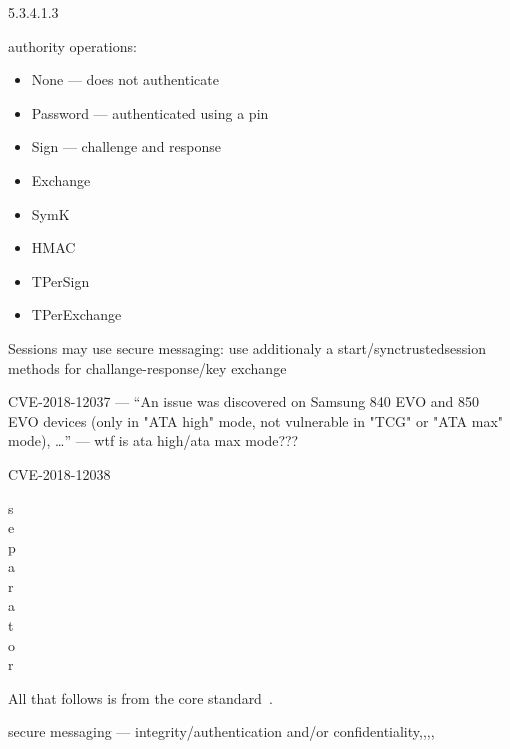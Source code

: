 \documentclass[
  digital, %
  oneside, %
  nolof,     %
  nolot,     %
]{fithesis4}
\begin{document}
5.3.4.1.3

authority operations: 
\begin{itemize}
    \item None --- does not authenticate
    \item Password --- authenticated using a pin
    \item Sign --- challenge and response
    \item Exchange
    \item SymK
    \item HMAC
    \item TPerSign
    \item TPerExchange
\end{itemize}

Sessions may use secure messaging: 
use additionaly a start/synctrustedsession methods for challange-response/key exchange

CVE-2018-12037  --- ``An issue was discovered on Samsung 840 EVO and 850 EVO devices (only in "ATA high" mode, not vulnerable in "TCG" or "ATA max" mode), \dots'' --- wtf is ata high/ata max mode???

CVE-2018-12038


s \\
e \\
p \\
a \\
r \\
a \\
t \\
o \\
r \\


\newpage

All that follows is from the core standard~\cite{tcg-storage-core}.





secure messaging --- integrity/authentication and/or confidentiality,,,,




\end{document}
